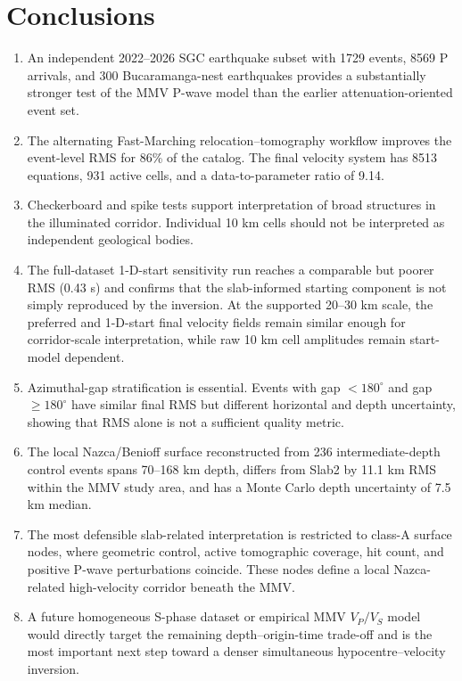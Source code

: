 \documentclass[review,authoryear]{elsarticle}
\begin{document}
\section{Conclusions}
\begin{enumerate}
\item An independent 2022--2026 SGC earthquake subset with 1729 events, 8569 P arrivals, and 300 Bucaramanga-nest earthquakes provides a substantially stronger test of the MMV P-wave model than the earlier attenuation-oriented event set.
\item The alternating Fast-Marching relocation--tomography workflow improves the event-level RMS for 86\% of the catalog. The final velocity system has 8513 equations, 931 active cells, and a data-to-parameter ratio of 9.14.
\item Checkerboard and spike tests support interpretation of broad structures in the illuminated corridor. Individual 10 km cells should not be interpreted as independent geological bodies.
\item The full-dataset 1-D-start sensitivity run reaches a comparable but poorer RMS (0.43 s) and confirms that the slab-informed starting component is not simply reproduced by the inversion. At the supported 20--30 km scale, the preferred and 1-D-start final velocity fields remain similar enough for corridor-scale interpretation, while raw 10 km cell amplitudes remain start-model dependent.
\item Azimuthal-gap stratification is essential. Events with gap $<180^\circ$ and gap $\geq180^\circ$ have similar final RMS but different horizontal and depth uncertainty, showing that RMS alone is not a sufficient quality metric.
\item The local Nazca/Benioff surface reconstructed from 236 intermediate-depth control events spans 70--168 km depth, differs from Slab2 by 11.1 km RMS within the MMV study area, and has a Monte Carlo depth uncertainty of 7.5 km median.
\item The most defensible slab-related interpretation is restricted to class-A surface nodes, where geometric control, active tomographic coverage, hit count, and positive P-wave perturbations coincide. These nodes define a local Nazca-related high-velocity corridor beneath the MMV.
\item A future homogeneous S-phase dataset or empirical MMV $V_P/V_S$ model would directly target the remaining depth--origin-time trade-off and is the most important next step toward a denser simultaneous hypocentre--velocity inversion.
\end{enumerate}
\end{document}
